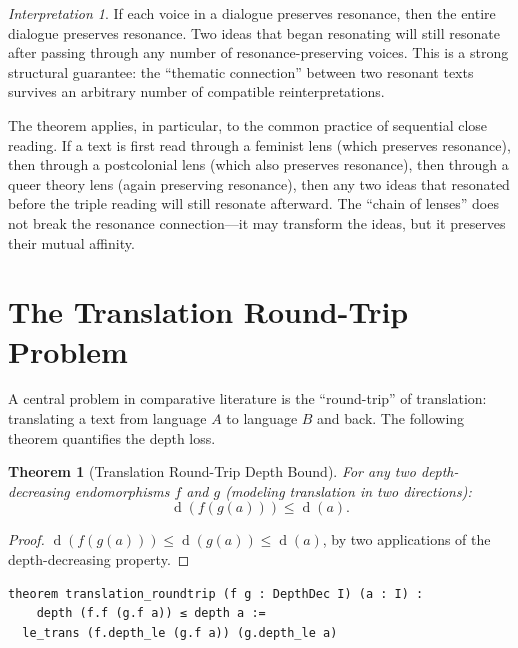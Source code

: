 \documentclass[11pt,openany]{book}
\theoremstyle{definition}
\theoremstyle{plain}
\newtheorem{theorem}[axiom]{Theorem}
\theoremstyle{remark}
\newtheorem{interpretation}[axiom]{Interpretation}
\newcommand{\depth}{\operatorname{d}}       %
\begin{document}
\begin{interpretation}
If each voice in a dialogue preserves resonance, then the entire dialogue preserves resonance. Two ideas that began resonating will still resonate after passing through any number of resonance-preserving voices. This is a strong structural guarantee: the ``thematic connection'' between two resonant texts survives an arbitrary number of compatible reinterpretations.

The theorem applies, in particular, to the common practice of sequential close reading. If a text is first read through a feminist lens (which preserves resonance), then through a postcolonial lens (which also preserves resonance), then through a queer theory lens (again preserving resonance), then any two ideas that resonated before the triple reading will still resonate afterward. The ``chain of lenses'' does not break the resonance connection---it may transform the ideas, but it preserves their mutual affinity.
\end{interpretation}

\section{The Translation Round-Trip Problem}

A central problem in comparative literature is the ``round-trip'' of translation: translating a text from language $A$ to language $B$ and back. The following theorem quantifies the depth loss.

\begin{theorem}[Translation Round-Trip Depth Bound]
For any two depth-decreasing endomorphisms $f$ and $g$ (modeling translation in two directions):
\[
\depth(f(g(a))) \leq \depth(a).
\]
\end{theorem}

\begin{proof}
$\depth(f(g(a))) \leq \depth(g(a)) \leq \depth(a)$, by two applications of the depth-decreasing property.
\end{proof}

\begin{lstlisting}[language=Lean4]
theorem translation_roundtrip (f g : DepthDec I) (a : I) :
    depth (f.f (g.f a)) ≤ depth a :=
  le_trans (f.depth_le (g.f a)) (g.depth_le a)
\end{lstlisting}
\end{document}
